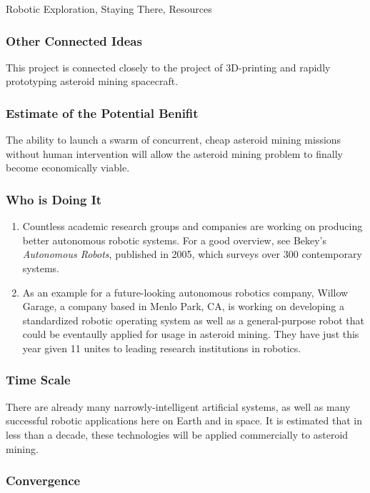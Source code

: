 \documentclass[english]{article}
\begin{document}
Robotic Exploration, Staying There, Resources


\subsubsection{Other Connected Ideas}

This project is connected closely to the project of 3D-printing and
rapidly prototyping asteroid mining spacecraft.


\subsubsection{Estimate of the Potential Benifit}

The ability to launch a swarm of concurrent, cheap asteroid mining
missions without human intervention will allow the asteroid mining
problem to finally become economically viable.


\subsubsection{Who is Doing It}

\begin{enumerate}
\item Countless academic research groups and companies are working on producing
better autonomous robotic systems. For a good overview, see Bekey's
\emph{Autonomous Robots}, published in 2005, which surveys over 300
contemporary systems\cite{bekey}.
\item As an example for a future-looking autonomous robotics company, Willow
Garage, a company based in Menlo Park, CA, is working on developing
a standardized robotic operating system as well as a general-purpose
robot that could be eventaully applied for usage in asteroid mining.
They have just this year given 11 unites to leading research institutions
in robotics\cite{willow}.
\end{enumerate}

\subsubsection{Time Scale}

There are already many narrowly-intelligent artificial systems, as
well as many successful robotic applications here on Earth and in
space. It is estimated that in less than a decade, these technologies
will be applied commercially to asteroid mining.


\subsubsection{Convergence}
\end{document}
